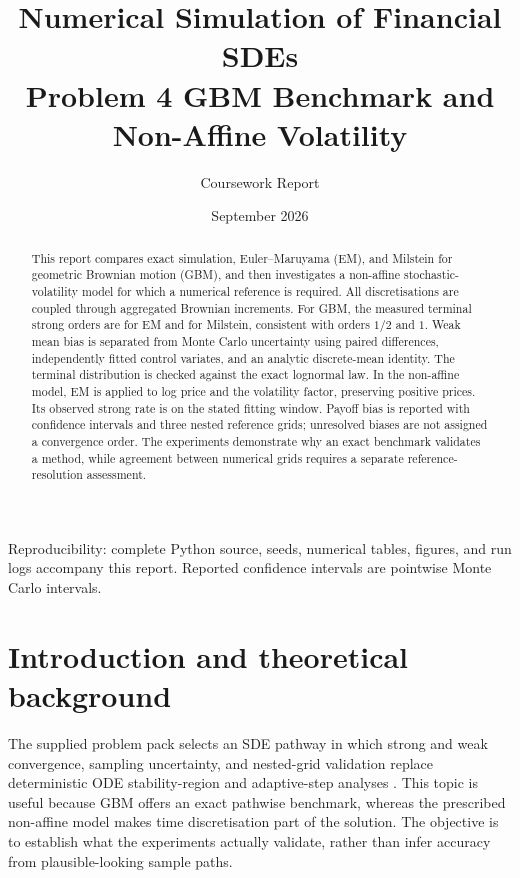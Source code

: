 \documentclass[11pt,a4paper]{article}
\title{Numerical Simulation of Financial SDEs\\
\large Problem 4 GBM Benchmark and Non-Affine Volatility}
\author{Coursework Report}
\date{September 2026}
\begin{document}
\maketitle
\begin{abstract}
This report compares exact simulation, Euler--Maruyama (EM), and Milstein for geometric Brownian motion (GBM), and then investigates a non-affine stochastic-volatility model for which a numerical reference is required. All discretisations are coupled through aggregated Brownian increments. For GBM, the measured terminal strong orders are \GBMEMRate{} for EM and \GBMMilRate{} for Milstein, consistent with orders $1/2$ and $1$. Weak mean bias is separated from Monte Carlo uncertainty using paired differences, independently fitted control variates, and an analytic discrete-mean identity. The terminal distribution is checked against the exact lognormal law. In the non-affine model, EM is applied to log price and the volatility factor, preserving positive prices. Its observed strong rate is \NARate{} on the stated fitting window. Payoff bias is reported with confidence intervals and three nested reference grids; unresolved biases are not assigned a convergence order. The experiments demonstrate why an exact benchmark validates a method, while agreement between numerical grids requires a separate reference-resolution assessment.
\end{abstract}
\tableofcontents
\vfill
\noindent\small Reproducibility: complete Python source, seeds, numerical tables, figures, and run logs accompany this report. Reported confidence intervals are pointwise Monte Carlo intervals.

\newpage
\section{Introduction and theoretical background}
The supplied problem pack selects an SDE pathway in which strong and weak convergence, sampling uncertainty, and nested-grid validation replace deterministic ODE stability-region and adaptive-step analyses \cite{pack}. This topic is useful because GBM offers an exact pathwise benchmark, whereas the prescribed non-affine model makes time discretisation part of the solution. The objective is to establish what the experiments actually validate, rather than infer accuracy from plausible-looking sample paths.
\end{document}

